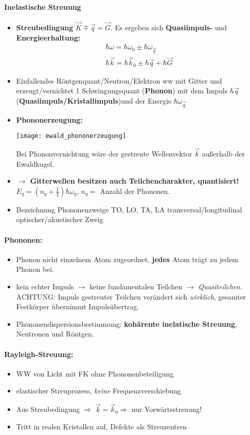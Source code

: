\documentclass[a4paper,12pt]{article}
\begin{document}
\paragraph*{Inelastische Streuung}\begin{itemize}
	\item \textbf{Streubedingung} $ \vec K \mp \vec q= \vec G $. Es ergeben sich \textbf{Quasiimpuls-} und \textbf{Energieerhaltung:} \begin{align*}
	\hbar \omega = \hbar \omega_0 \pm \hbar \omega_{\vec{q}}\\
	\hbar \vec k = \hbar \vec k_0 \pm \hbar \vec q + \hbar \vec G
	\end{align*}
	\item Einfallendes Röntgenquant/Neutron/Elektron ww mit Gitter und erzeugt/vernichtet 1 Schwingungsquant (\textbf{Phonon}) mit dem Impuls $ \hbar \vec q $  (\textbf{Quasiimpuls/Kristallimpuls})und der Energie $ \hbar \omega_{\vec{q}} $
	\item \textbf{Phononerzeugung:}
	\begin{center}
		\texttt{[image: ewald\_phononerzeugung]}
	\end{center}
	Bei Phononvernichtung wäre der gestreute Wellenvektor $ \vec k $ außerhalb der Ewaldkugel.
	\item \textbf{$ \rightarrow $ Gitterwellen besitzen auch Teilchencharakter, quantisiert!} $ E_q = \left(n_q+ \frac12\right) \hbar \omega_q $, $ n_q =$ Anzahl der Phononen.
	\item Bezeichnung Phononenzweige TO, LO, TA, LA transversal/longitudinal optischer/akustischer Zweig
\end{itemize}
\paragraph*{Phononen:} \begin{itemize}
	\item Phonon  nicht einzelnem Atom zugeordnet, \textbf{jedes} Atom trägt zu jedem Phonon bei.
	\item kein echter Impuls $ \rightarrow $ keine fundamentalen Teilchen $ \rightarrow $ \emph{Quasiteilchen}. ACHTUNG: Impuls gestreuter Teilchen verändert sich \emph{wirklich}, gesamter Festkörper übernimmt Impulsübertrag.
	\item Phononendispersionsbestimmung: \textbf{kohärente inelatische Streuung}, Neutronen und Röntgen.
	\end{itemize}
\paragraph*{Rayleigh-Streuung:} \begin{itemize}
	\item WW von Licht mit FK ohne Phononenbeteiligung
	\item elastischer Streuprozess, \emph{keine} Frequenzverschiebung
	\item Aus Streubedingung $ \Rightarrow $ $ \vec k = \vec k_0 \Rightarrow $ nur Vorwärtsstreuung!
	\item Tritt in realen Kristallen auf, Defekte als Streuzentren
\end{itemize}
\end{document}
